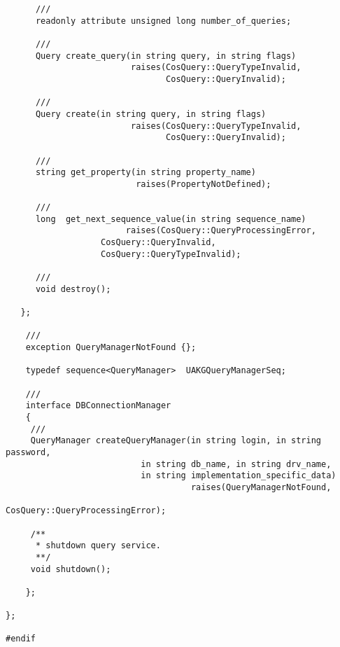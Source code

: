 \documentclass[10pt]{article}
\begin{document}
\begin{verbatim}
      ///
      readonly attribute unsigned long number_of_queries;

      ///
      Query create_query(in string query, in string flags)
                         raises(CosQuery::QueryTypeInvalid,
                                CosQuery::QueryInvalid);

      ///
      Query create(in string query, in string flags)
                         raises(CosQuery::QueryTypeInvalid,
                                CosQuery::QueryInvalid);

      ///
      string get_property(in string property_name)
                          raises(PropertyNotDefined);

      ///
      long  get_next_sequence_value(in string sequence_name)
                        raises(CosQuery::QueryProcessingError,
			       CosQuery::QueryInvalid,
			       CosQuery::QueryTypeInvalid);
      
      ///
      void destroy();

   };

    ///
    exception QueryManagerNotFound {};
    
    typedef sequence<QueryManager>  UAKGQueryManagerSeq;

    ///
    interface DBConnectionManager
    {
     ///
     QueryManager createQueryManager(in string login, in string password, 
                           in string db_name, in string drv_name,
                           in string implementation_specific_data)
                                     raises(QueryManagerNotFound,
                                            CosQuery::QueryProcessingError);

     /**
      * shutdown query service.
      **/
     void shutdown();

    };

};

#endif
\end{verbatim}
\end{document}

